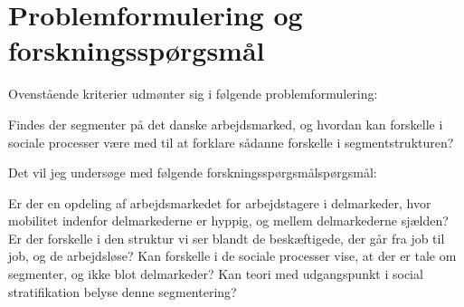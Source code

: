 \chapter{Problemformulering og forskningsspørgsmål}


%
Ovenstående kriterier udmønter sig i følgende problemformulering:
%
\vspace{\baselineskip}
%
\begin{tcolorbox}[title=\textbf{Problemformulering}]
Findes der segmenter på det danske arbejdsmarked, og hvordan kan forskelle i sociale processer være med til at forklare sådanne forskelle i segmentstrukturen?
\end{tcolorbox}
%
\vspace{\baselineskip}
Det vil jeg undersøge med følgende forskningsspørgsmålspørgsmål:
\vspace{\baselineskip}
\begin{tcolorbox}[title=Forskningspørgsmål,
subtitle style={boxrule=0.4pt} ]
Er der en opdeling af arbejdsmarkedet for arbejdstagere i delmarkeder, hvor mobilitet indenfor delmarkederne er hyppig, og mellem delmarkederne sjælden?
Er der forskelle i den struktur vi ser blandt de beskæftigede, der går fra job til job, og de arbejdsløse?
Kan forskelle i de sociale processer vise, at der er tale om segmenter, og ikke blot delmarkeder?
Kan teori med udgangspunkt i social stratifikation belyse denne segmentering?
\end{tcolorbox}